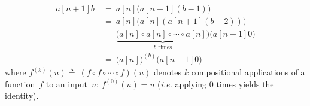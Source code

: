 \begin{equation*}
\begin{array}{lll}
a[n+1]b ~& = ~ a[n]\big(a[n+1](b-1)\big) \\
         & = ~ a[n]\big(a[n](a[n+1](b-2))\big) \\
         & = ~ \underbrace{\big( a[n]\circ a[n]\circ \cdots \circ a[n] \big)}_{b \text{ times}} \big(a[n+1]0\big) \\
         & = ~ \big(a[n]\big)^{(b)}\big(a[n+1]0\big)
\end{array}
\end{equation*}
where $f^{(k)}(u) \triangleq ~ (f\circ f\circ \cdots \circ f)(u)$ denotes $k$ compositional applications of a function~$f$ to an
input~$u$; $f^{(0)}(u) = u$ \linebreak (\emph{i.e.} applying $0$ times yields the identity).

